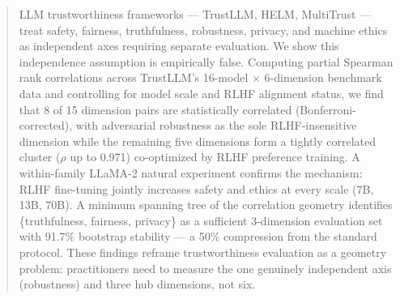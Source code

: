 \begin{abstract}
LLM trustworthiness frameworks --- TrustLLM, HELM, MultiTrust --- treat safety, fairness, truthfulness, robustness, privacy, and machine ethics as independent axes requiring separate evaluation. We show this independence assumption is empirically false. Computing partial Spearman rank correlations across TrustLLM's 16-model $\times$ 6-dimension benchmark data and controlling for model scale and RLHF alignment status, we find that 8 of 15 dimension pairs are statistically correlated (Bonferroni-corrected), with adversarial robustness as the sole RLHF-insensitive dimension while the remaining five dimensions form a tightly correlated cluster ($\rho$ up to 0.971) co-optimized by RLHF preference training. A within-family LLaMA-2 natural experiment confirms the mechanism: RLHF fine-tuning jointly increases safety and ethics at every scale (7B, 13B, 70B). A minimum spanning tree of the correlation geometry identifies \{truthfulness, fairness, privacy\} as a sufficient 3-dimension evaluation set with 91.7\% bootstrap stability --- a 50\% compression from the standard protocol. These findings reframe trustworthiness evaluation as a geometry problem: practitioners need to measure the one genuinely independent axis (robustness) and three hub dimensions, not six.
\end{abstract}
